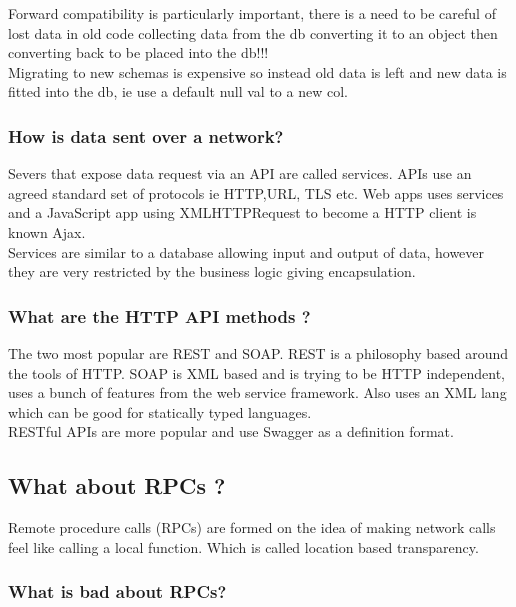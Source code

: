 \documentclass[11pt]{scrartcl} %
\begin{document}
Forward compatibility is particularly important, there is a need to be careful of lost data in old code
collecting data from the db converting it to an object then converting back to be placed into the db!!!\\

Migrating to new schemas is expensive so instead old data is left and new data is fitted into the db,
ie use a default null val to a new col.

\subsubsection{How is data sent over a network?}

Severs that expose data request via an API are called services. APIs use an agreed standard set of
protocols ie HTTP,URL, TLS etc. Web apps uses services and a JavaScript app using XMLHTTPRequest to become
a HTTP client is known Ajax.\\

Services are similar to a database allowing input and output of data, however they are very 
restricted by the business logic giving encapsulation.

\subsubsection{What are the HTTP API methods ?}

The two most popular are REST and SOAP. REST is a philosophy based around the tools of HTTP. SOAP
is XML based and is trying to be HTTP independent, uses a bunch of features from the web service
framework. Also uses an XML lang which can be good for statically typed languages.\\

RESTful APIs are more popular and use Swagger as a definition format.

\subsection{What about RPCs ?}

Remote procedure calls (RPCs) are formed on the idea of making network calls feel like calling a
local function. Which is called location based transparency.

\subsubsection{What is bad about RPCs?}
\end{document}
